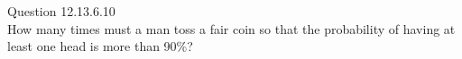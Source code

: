 \documentclass[11pt]{book}
\begin{document}
Question 12.13.6.10\\
How many times must a man toss a fair coin so that the probability of having at least one head is more than 90\%?
\end{document}
